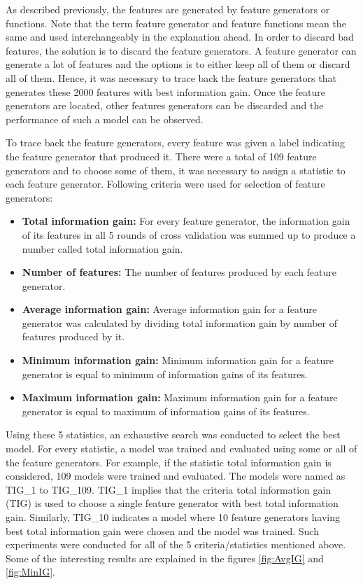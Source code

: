 As described previously, the features are generated by feature generators or functions. Note that the term feature generator and feature functions mean the same and used interchangeably in the explanation ahead. In order to discard bad features, the solution is to discard the feature generators. A feature generator can generate a lot of features and the options is to either keep all of them or discard all of them. Hence, it was necessary to trace back the feature generators that generates these 2000 features with best information gain. Once the feature generators are located, other features generators can be discarded and the performance of such a model can be observed.

To trace back the feature generators, every feature was given a label indicating the feature generator that produced it. There were a total of 109 feature generators and to choose some of them, it was necessary to assign a statistic to each feature generator. Following criteria were used for selection of feature generators:

\begin{itemize}

\item \textbf{Total information gain:} For every feature generator, the information gain of its features in all 5 rounds of cross validation was summed up to produce a number called total information gain.

\item \textbf{Number of features:} The number of features produced by each feature generator.

\item \textbf{Average information gain:} Average information gain for a feature generator was calculated by dividing total information gain by number of features produced by it.

\item \textbf{Minimum information gain:} Minimum information gain for a feature generator is equal to minimum of information gains of its features.

\item \textbf{Maximum information gain:} Maximum information gain for a feature generator is equal to maximum of information gains of its features.

\end{itemize}

Using these 5 statistics, an exhaustive search was conducted to select the best model. For every statistic, a model was trained and evaluated using some or all of the feature generators. For example, if the statistic total information gain is considered, 109 models were trained and evaluated. The models were named as TIG\_1 to TIG\_109. TIG\_1 implies that the criteria total information gain (TIG) is used to choose a single feature generator with best total information gain. Similarly, TIG\_10 indicates a model where 10 feature generators having best total information gain were chosen and the model was trained. Such experiments were conducted for all of the 5 criteria/statistics mentioned above. Some of the interesting results are explained in the figures \ref{fig:AvgIG} and \ref{fig:MinIG}.

